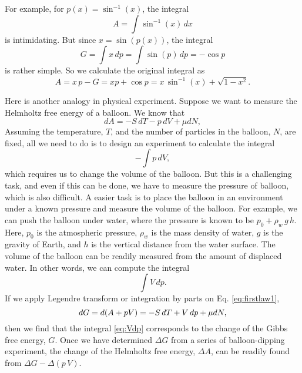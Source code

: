 \documentclass{article}
\begin{document}
For example, for $p(x) = \sin^{-1}(x)$, the integral
$$
A = \int \sin^{-1}(x) \, dx
$$
is intimidating.
%
But since $x = \sin(p(x))$,
the integral
$$
G = \int x \, dp = \int \sin(p) \, dp = -\cos p
$$
is rather simple. So we calculate the original integral as
$$
A = x \, p - G = x p + \cos p = x \, \sin^{-1}(x) + \sqrt{1-x^2}.
$$

Here is another analogy in physical experiment.
%
Suppose we want to measure the Helmholtz free energy of a balloon.
%
We know that
%
\begin{equation}
  dA = -S\,dT - p \, dV + \mu dN,
  \label{eq:firstlaw1}
\end{equation}
%
Assuming the temperature, $T$,
and the number of particles in the balloon, $N$, are fixed,
all we need to do is to design an experiment to calculate the integral
$$
-\int p \, dV,
$$
which requires us to change the volume of the balloon.
%
But this is a challenging task, and
even if this can be done, we have to measure the pressure of balloon,
which is also difficult.
%
A easier task is to place the balloon in an environment
under a known pressure and measure the volume of the balloon.
%
For example, we can push the balloon under water,
where the pressure is known to be $p_0 + \rho_w \, g \, h$.
Here, $p_0$ is the atmospheric pressure, $\rho_w$ is the mass density of water,
$g$ is the gravity of Earth, and $h$ is the vertical distance from the water surface.
%
The volume of the balloon can be readily measured from the amount of displaced water.
%
In other words, we can compute the integral
\begin{equation}
\int V \, dp.
\label{eq:Vdp}
\end{equation}
%
If we apply Legendre transform or
integration by parts on Eq. \eqref{eq:firstlaw1},
%
\begin{equation}
  dG = d(A + pV) = -S\,dT + V \, dp + \mu dN
  ,
  \notag
\end{equation}
%
then we find that the integral \eqref{eq:Vdp} corresponds to
the change of the Gibbs free energy, $G$.
%
Once we have determined $\Delta G$
from a series of balloon-dipping experiment,
the change of the Helmholtz free energy, $\Delta A$,
can be readily found from $\Delta G - \Delta( p \, V)$.
\end{document}
